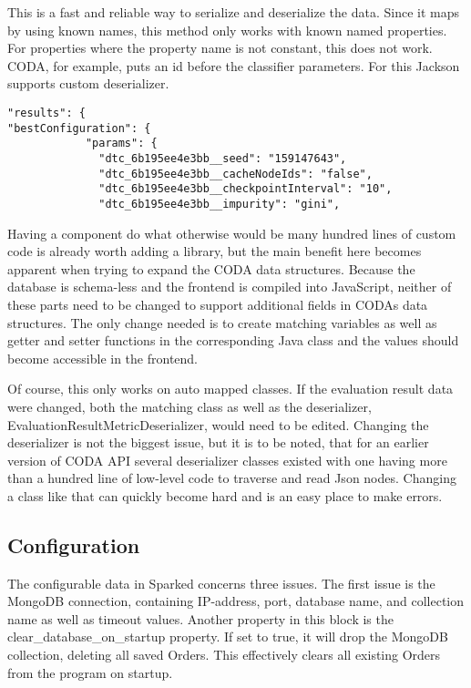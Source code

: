 This is a fast and reliable way to serialize and deserialize the data. Since it maps by using known names, this method only works with known named properties. For properties where the property name is not constant, this does not work. CODA, for example, puts an id before the classifier parameters. For this Jackson supports custom deserializer. 

\begin{lstlisting}[caption={Objects with changing variable names need a more complex deserialization procedure.},captionpos=b]
"results": {
"bestConfiguration": {
     		"params": {
              "dtc_6b195ee4e3bb__seed": "159147643",
              "dtc_6b195ee4e3bb__cacheNodeIds": "false",
              "dtc_6b195ee4e3bb__checkpointInterval": "10",
              "dtc_6b195ee4e3bb__impurity": "gini",
\end{lstlisting}

Having a component do what otherwise would be many hundred lines of custom code is already worth adding a library, but the main benefit here becomes apparent when trying to expand the CODA data structures. Because the database is schema-less and the frontend is compiled into JavaScript, neither of these parts need to be changed to support additional fields in CODAs data structures. The only change needed is to create matching variables as well as getter and setter functions in the corresponding Java class and the values should become accessible in the frontend.

Of course, this only works on auto mapped classes. If the evaluation result data were changed, both the matching class as well as the deserializer, EvaluationResultMetricDeserializer, would need to be edited. Changing the deserializer is not the biggest issue, but it is to be noted, that for an earlier version of CODA API several deserializer classes existed with one having more than a hundred line of low-level code to traverse and read Json nodes. Changing a class like that can quickly become hard and is an easy place to make errors. 

\subsection{Configuration}
The configurable data in Sparked concerns three issues. The first issue is the MongoDB connection, containing IP-address, port, database name, and collection name as well as timeout values. Another property in this block is the clear\_database\_on\_startup property. If set to true, it will drop the MongoDB collection, deleting all saved Orders. This effectively clears all existing Orders from the program on startup.

